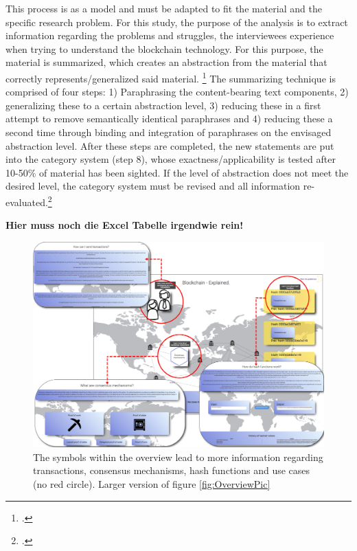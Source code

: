 This process is as a model and must be adapted to fit the material and the specific research problem. For this study, the purpose of the analysis is to extract information regarding the problems and struggles, the interviewees experience when trying to understand the blockchain technology. For this purpose, the material is summarized, which creates an abstraction from the material that correctly represents/generalized said material. \footcite[Cf.][p.68]{MayringQualitativeContentAnalysis2014} The summarizing technique is comprised of four steps: 1) Paraphrasing the content-bearing text components, 2) generalizing these to a certain abstraction level, 3) reducing these in a first attempt to remove semantically identical paraphrases and 4) reducing these a second time through binding and integration of paraphrases on the envisaged abstraction level. After these steps are completed, the new statements are put into the category system (step 8), whose exactness/applicability is tested after 10-50\% of material has been sighted. If the level of abstraction does not meet the desired level, the category system must be revised and all information re-evaluated.\footcite[Cf.][p.68 et seq]{MayringQualitativeContentAnalysis2014}


\textbf{Hier muss noch die Excel Tabelle irgendwie rein!}



\begin{figure}[H]
    \centering
    \includegraphics[height=0.9\textwidth, angle=90]{latex-vorlage_v1.5/graphics/Overview_Big.png}
    \caption{The symbols within the overview lead to more information regarding transactions, consensus mechanisms, hash functions and use cases (no red circle). Larger version of figure \ref{fig:OverviewPic}}
    \label{fig:my_label}
\end{figure}


